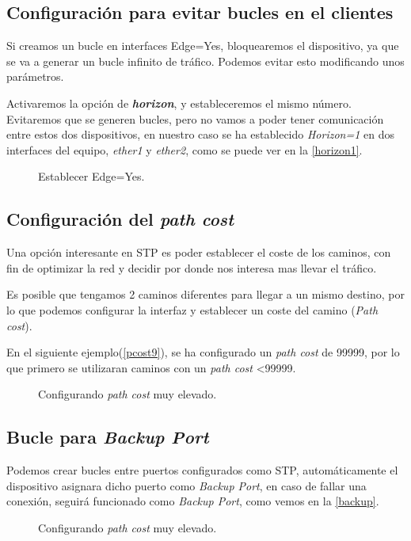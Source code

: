 \subsection{Configuración para evitar bucles en el clientes}
\label{horizon4}

Si creamos un bucle en interfaces Edge=Yes, bloquearemos el dispositivo, ya que se va a generar un bucle infinito de tráfico. Podemos evitar esto modificando unos parámetros.

Activaremos la opción de \textbf{\textit{horizon}}, y estableceremos el mismo número. Evitaremos que se generen bucles, pero no vamos a poder tener comunicación entre estos dos dispositivos, en nuestro caso se ha establecido \textit{Horizon=1} en dos interfaces del equipo, \textit{ether1} y \textit{ether2}, como se puede ver en la \autoref{horizon1}.

\begin{figure}[h!]\centering
	\caption{Establecer Edge=Yes.}
	\label{horizon1}
	\bigskip
\end{figure}

\clearpage
\subsection{Configuración del \textit{path cost}}
\label{pathcost}
Una opción interesante en STP es poder establecer el coste de los caminos, con fin de optimizar la red y decidir por donde nos interesa mas llevar el tráfico.

Es posible que tengamos 2 caminos diferentes para llegar a un mismo destino, por lo que podemos configurar la interfaz y establecer un coste del camino (\textit{Path cost}).

En el siguiente ejemplo(\autoref{pcost9}), se ha configurado un \textit{path cost} de 99999, por lo que primero se utilizaran caminos con un \textit{path cost} <99999.\\[0.5cm]

\begin{figure}[h!]\centering
	\caption{Configurando \textit{path cost} muy elevado.}
	\label{pcost9}
	\bigskip
\end{figure}



\subsection{Bucle para \textit{Backup Port}}
\label{backuport}
Podemos crear bucles entre puertos configurados como STP, automáticamente el dispositivo asignara dicho puerto como \textit{Backup Port}, en caso de fallar una conexión, seguirá funcionado como \textit{Backup Port}, como vemos en la \autoref{backup}.

\begin{figure}[h!]\centering
	\caption{Configurando \textit{path cost} muy elevado.}
	\label{backup}
	\bigskip
\end{figure}






